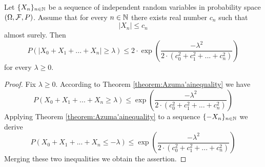 \begin{corollary}\label{corollary:absolutevalueestimation}
Let $\{X_n\}_{n\in {\mathbb N}}$ be a sequence of independent random variables in probability space $\left(\Omega, {\mathcal F},P\right)$. Assume that for every $n\in {\mathbb N}$ there exists real number $c_n$ such that 
$$|X_n|\leq c_n$$
almost surely. Then 
$$P\left(|X_0+X_1+...+X_n|\geq \lambda\right)\leq 2\cdot \exp\left(\frac{-\lambda^2}{2\cdot \left(c_0^2+c_1^2+...+c^2_n\right)}\right)$$
for every $\lambda \geq 0$.
\end{corollary}
\begin{proof}
Fix $\lambda \geq 0$. According to Theorem \ref{theorem:Azuma'ainequality} we have
$$P\left(X_0+X_1+...+X_n\geq \lambda\right)\leq \exp\left(\frac{-\lambda^2}{2\cdot \left(c_0^2+c_1^2+...+c^2_n\right)}\right)$$
Applying Theorem \ref{theorem:Azuma'ainequality} to a sequence $\{-X_n\}_{n\in {\mathbb N}}$ we derive
$$P\left(X_0+X_1+...+X_n\leq -\lambda\right)\leq \exp\left(\frac{-\lambda^2}{2\cdot \left(c_0^2+c_1^2+...+c^2_n\right)}\right)$$
Merging these two inequalities we obtain the assertion.
\end{proof}

